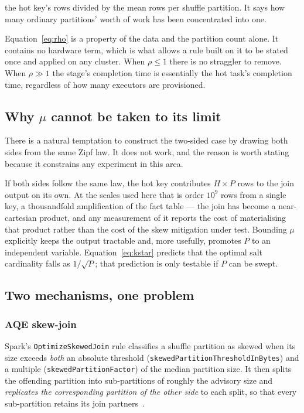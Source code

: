 the hot key's rows divided by the mean rows per shuffle partition. It says how
many ordinary partitions' worth of work has been concentrated into one.

Equation~\eqref{eq:rho} is a property of the data and the partition count
alone. It contains no hardware term, which is what allows a rule built on it to
be stated once and applied on any cluster. When $\rho \le 1$ there is no
straggler to remove. When $\rho \gg 1$ the stage's completion time is
essentially the hot task's completion time, regardless of how many executors are
provisioned.

\subsection{Why $\mu$ cannot be taken to its limit}

There is a natural temptation to construct the two-sided case by drawing both
sides from the same Zipf law. It does not work, and the reason is worth stating
because it constrains any experiment in this area.

If both sides follow the same law, the hot key contributes $H \times P$ rows to
the join output on its own. At the scales used here that is order $10^{9}$
rows from a single key, a thousandfold amplification of the fact table --- the join has become a near-cartesian product, and
any measurement of it reports the cost of materialising that product rather
than the cost of the skew mitigation under test. Bounding $\mu$ explicitly
keeps the output tractable and, more usefully, promotes $P$ to an independent
variable. Equation~\eqref{eq:kstar} predicts that the optimal salt cardinality
falls as $1/\sqrt{P}$; that prediction is only testable if $P$ can be swept.

\subsection{Two mechanisms, one problem}

\subsubsection{AQE skew-join}
Spark's \texttt{OptimizeSkewedJoin} rule classifies a shuffle partition as
skewed when its size exceeds \emph{both} an absolute threshold
(\texttt{skewedPartitionThresholdInBytes}) and a multiple
(\texttt{skewedPartitionFactor}) of the median partition size. It then splits
the offending partition into sub-partitions of roughly the advisory size and
\emph{replicates the corresponding partition of the other side} to each split,
so that every sub-partition retains its join partners~\cite{spark_aqe_docs,
xue2024adaptive}.

